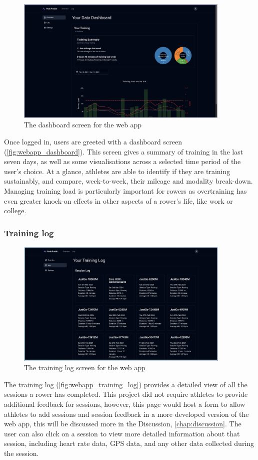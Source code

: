 \begin{figure}[htbp]
  \centering
  \includegraphics[height=6cm]{figures/fyp_dash_overview.jpeg}
  \captionsetup{justification=centering}
  \caption[Web app Dashboard]{The dashboard screen for the web app} \label{fig:webapp_dashboard}
\end{figure}

Once logged in, users are greeted with a dashboard screen (\autoref{fig:webapp_dashboard}). This screen gives a summary of training in the last seven days, as well as some visualisations across a selected time period of the user's choice. At a glance, athletes are able to identify if they are training sustainably, and compare, week-to-week, their mileage and modality break-down. Managing training load is particularly important for rowers as overtraining has even greater knock-on effects in other aspects of a rower's life, like work or college. 

\subsubsection{Training log}

\begin{figure}[htbp]
  \centering
  \includegraphics[height=6cm]{figures/fyp_training_log.jpeg}
  \captionsetup{justification=centering}
  \caption[Web app Training Log]{The training log screen for the web app} \label{fig:webapp_training_log}
\end{figure}
The training log (\autoref{fig:webapp_training_log}) provides a detailed view of all the sessions a rower has completed. This project did not require athletes to provide additional feedback for sessions, however, this page would host a form to allow athletes to add sessions and session feedback in a more developed version of the web app, this will be discussed more in the Discussion, \autoref{chap:discussion}. The user can also click on a session to view more detailed information about that session, including heart rate data, GPS data, and any other data collected during the session. 

